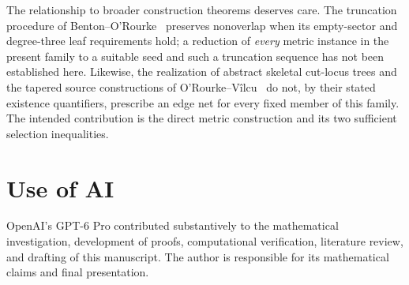 \documentclass[a4paper,11pt]{amsart}
\begin{document}
The relationship to broader construction theorems deserves care. The truncation procedure of Benton--O'Rourke~\cite{BentonORourke2007} preserves nonoverlap when its empty-sector and degree-three leaf requirements hold; a reduction of \emph{every} metric instance in the present family to a suitable seed and such a truncation sequence has not been established here. Likewise, the realization of abstract skeletal cut-locus trees and the tapered source constructions of O'Rourke--V\^ilcu~\cite{ORourkeVilcu2025} do not, by their stated existence quantifiers, prescribe an edge net for every fixed member of this family. The intended contribution is the direct metric construction and its two sufficient selection inequalities.

\section*{Use of AI}
OpenAI's GPT-6 Pro contributed substantively to the mathematical investigation, development of proofs, computational verification, literature review, and drafting of this manuscript. The author is responsible for its mathematical claims and final presentation.
\end{document}
